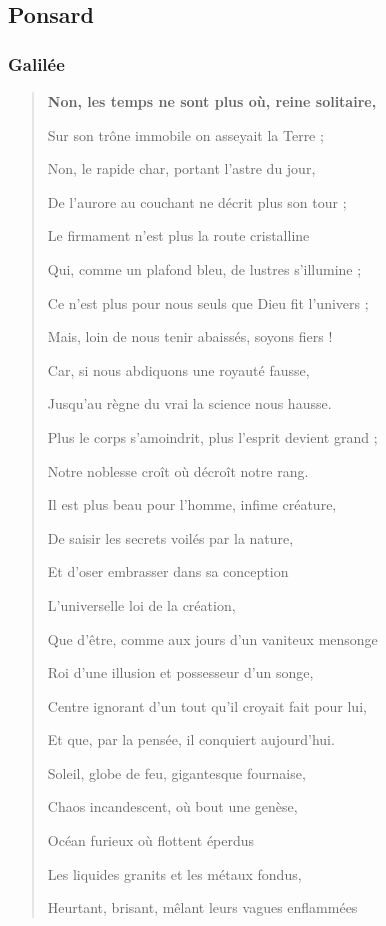 \documentclass[a4paper, 11pt, oneside, landscape]{article}
\begin{document}
\subsection{Ponsard}
\subsubsection{Galilée}
\begin{quotation}\bfseries\small
Non, les temps ne sont plus où, reine solitaire,

Sur son trône immobile on asseyait la Terre ;

Non, le rapide char, portant l'astre du jour,

De l'aurore au couchant ne décrit plus son tour ;

Le firmament n'est plus la route cristalline

Qui, comme un plafond bleu, de lustres s'illumine ;

Ce n'est plus pour nous seuls que Dieu fit l'univers ;

Mais, loin de nous tenir abaissés, soyons fiers !

Car, si nous abdiquons une royauté fausse,

Jusqu'au règne du vrai la science nous hausse.

Plus le corps s'amoindrit, plus l'esprit devient grand ;

Notre noblesse croît où décroît notre rang.

Il est plus beau pour l'homme, infime créature,

De saisir les secrets voilés par la nature,

Et d'oser embrasser dans sa conception

L'universelle loi de la création,

Que d'être, comme aux jours d'un vaniteux mensonge

Roi d'une illusion et possesseur d'un songe,

Centre ignorant d'un tout qu'il croyait fait pour lui,

Et que, par la pensée, il conquiert aujourd'hui.

\bigskip

Soleil, globe de feu, gigantesque fournaise,

Chaos incandescent, où bout une genèse,

Océan furieux où flottent éperdus

Les liquides granits et les métaux fondus,

Heurtant, brisant, mêlant leurs vagues enflammées


\end{quotation}
\end{document}
